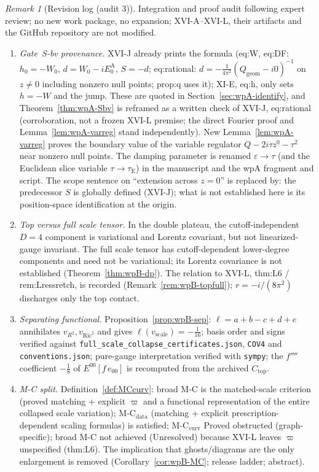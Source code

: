 \documentclass{article}
\theoremstyle{remark}
\newtheorem{remark}[proposition]{Remark}
\begin{document}
\begin{remark}[Revision log (audit 3)]
\label{rem:revlog3}
Integration and proof audit following expert review; no new work package, no expansion; XVI-A--XVI-L, their artifacts and the GitHub repository are not modified.
\begin{enumerate}
\item \emph{Gate~S-bv provenance.} XVI-J already prints the formula (eq:W, eq:DF: $h_0=-W_0$, $d=W_0-iE_0^{\mathrm A}$, $S=-d$; eq:rational: $d=-\frac1{4\pi^2}(Q_{\mathrm{geom}}-i0)^{-1}$ on $z\neq0$ including nonzero null points; prop:q uses it); XI-E, eq:h, only sets $h=-W$ and the jump. These are quoted in Section~\ref{sec:wpA-identify}, and Theorem~\ref{thm:wpA-Sbv} is reframed as a written check of XVI-J, eq:rational (corroboration, not a frozen XVI-L premise; the direct Fourier proof and Lemma~\ref{lem:wpA-varreg} stand independently). New Lemma~\ref{lem:wpA-varreg} proves the boundary value of the variable regulator $Q-2i\tau z^0-\tau^2$ near nonzero null points. The damping parameter is renamed $\varepsilon\to\tau$ (and the Euclidean slice variable $\tau\to\tau_{\mathrm E}$) in the manuscript and the wpA fragment and script. The scope sentence on ``extension across $z=0$'' is replaced by: the predecessor $S$ is globally defined (XVI-J); what is not established here is its position-space identification at the origin.
\item \emph{Top versus full scale tensor.} In the double plateau, the cutoff-independent $D=4$ component is variational and Lorentz covariant, but not linearized-gauge invariant. The full scale tensor has cutoff-dependent lower-degree components and need not be variational; its Lorentz covariance is not established (Theorem~\ref{thm:wpB-dp}). The relation to XVI-L, thm:L6 / rem:Lressretch, is recorded (Remark~\ref{rem:wpB-topfull}); $r=-i/(8\pi^2)$ discharges only the top contact.
\item \emph{Separating functional.} Proposition~\ref{prop:wpB-sep}: $\ell=a+b-c+d+e$ annihilates $v_{R^2},v_{\mathrm{Ric}^2}$ and gives $\ell(v_{\mathrm{scale}})=-\frac1{16}$; basis order and signs verified against \texttt{full\_scale\_collapse\_certificates.json}, \texttt{COV4} and \texttt{conventions.json}; pure-gauge interpretation verified with \texttt{sympy}; the $f''''$ coefficient $-\frac18$ of $E^{00}[f\,e_{00}]$ is recomputed from the archived $C_{\mathrm{top}}$.
\item \emph{M-C split.} Definition~\ref{def:MCcurv}: broad M-C is the matched-scale criterion (proved matching + explicit $\varpi$ and a functional representation of the entire collapsed scale variation); M-C$_{\mathrm{data}}$ (matching + explicit prescription-dependent scaling formulas) is satisfied; M-C$_{\mathrm{curv}}$ Proved obstructed (graph-specific); broad M-C not achieved (Unresolved) because XVI-L leaves $\varpi$ unspecified (thm:L6). The implication that ghosts/diagrams are the only enlargement is removed (Corollary~\ref{cor:wpB-MC}; release ladder; abstract).

\end{enumerate}
\end{remark}
\end{document}
